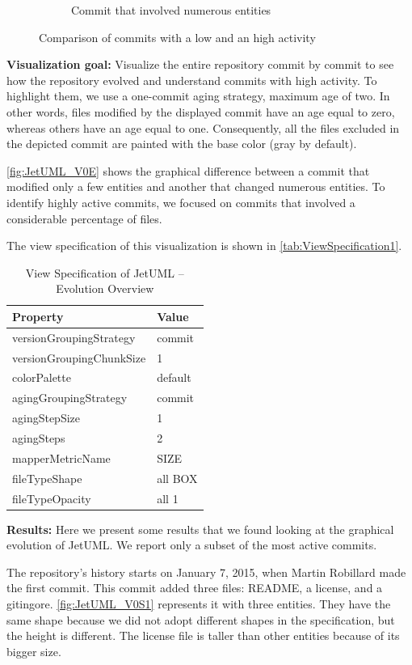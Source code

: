 \begin{figure}[t]
\begin{subfigure}{0.42\textwidth}
        \caption{Commit that involved numerous entities} \label{fig:JetUML_V0E1}
    \end{subfigure}
    \caption{Comparison of commits with a low and an high activity} 
    \label{fig:JetUML_V0E}
\end{figure}
\bigbreak
\noindent
\textbf{Visualization goal:} Visualize the entire repository commit by commit to see how the repository evolved and understand commits with high activity. 
To highlight them, we use a one-commit aging strategy, maximum age of two. In other words, files modified by the displayed commit have an age equal to zero, whereas others have an age equal to one.
Consequently, all the files excluded in the depicted commit are painted with the base color (gray by default). 

\autoref{fig:JetUML_V0E} shows the graphical difference between a commit that modified only a few entities and another that changed numerous entities. To identify highly active commits, we focused on commits that involved a considerable percentage of files.

The view specification of this visualization is shown in \autoref{tab:ViewSpecification1}.
\begin{table}[h]
	\small
    \centering
    \begin{tabular}{@{}ll@{}} 
        \toprule
        \textbf{Property} & \textbf{Value} \\\midrule
        versionGroupingStrategy & commit\\ 
		versionGroupingChunkSize & 1\\
		colorPalette & default\\
		agingGroupingStrategy & commit \\
		agingStepSize & 1 \\
		agingSteps & 2 \\
		mapperMetricName & SIZE \\
		fileTypeShape & all BOX \\
		fileTypeOpacity & all 1 \\\bottomrule
    \end{tabular}
    \caption{View Specification of JetUML – Evolution Overview}
    \label{tab:ViewSpecification1}
\end{table}

\bigbreak
\noindent
\textbf{Results:}
Here we present some results that we found looking at the graphical evolution of JetUML. 
We report only a subset of the most active commits. 

The repository's history starts on January 7, 2015, when Martin Robillard made the first commit. 
This commit added three files: README, a license, and a gitingore. 
\autoref{fig:JetUML_V0S1} represents it with three entities. They have the same shape because we did not adopt different shapes in the specification, but the height is different. The license file is taller than other entities because of its bigger size. 

